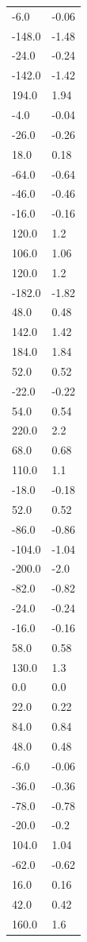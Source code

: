 \begin{longtable}{ll}
-6.0 & -0.06 \\
-148.0 & -1.48 \\
-24.0 & -0.24 \\
-142.0 & -1.42 \\
194.0 & 1.94 \\
-4.0 & -0.04 \\
-26.0 & -0.26 \\
18.0 & 0.18 \\
-64.0 & -0.64 \\
-46.0 & -0.46 \\
-16.0 & -0.16 \\
120.0 & 1.2 \\
106.0 & 1.06 \\
120.0 & 1.2 \\
-182.0 & -1.82 \\
48.0 & 0.48 \\
142.0 & 1.42 \\
184.0 & 1.84 \\
52.0 & 0.52 \\
-22.0 & -0.22 \\
54.0 & 0.54 \\
220.0 & 2.2 \\
68.0 & 0.68 \\
110.0 & 1.1 \\
-18.0 & -0.18 \\
52.0 & 0.52 \\
-86.0 & -0.86 \\
-104.0 & -1.04 \\
-200.0 & -2.0 \\
-82.0 & -0.82 \\
-24.0 & -0.24 \\
-16.0 & -0.16 \\
58.0 & 0.58 \\
130.0 & 1.3 \\
0.0 & 0.0 \\
22.0 & 0.22 \\
84.0 & 0.84 \\
48.0 & 0.48 \\
-6.0 & -0.06 \\
-36.0 & -0.36 \\
-78.0 & -0.78 \\
-20.0 & -0.2 \\
104.0 & 1.04 \\
-62.0 & -0.62 \\
16.0 & 0.16 \\
42.0 & 0.42 \\
160.0 & 1.6 \\

\end{longtable}

